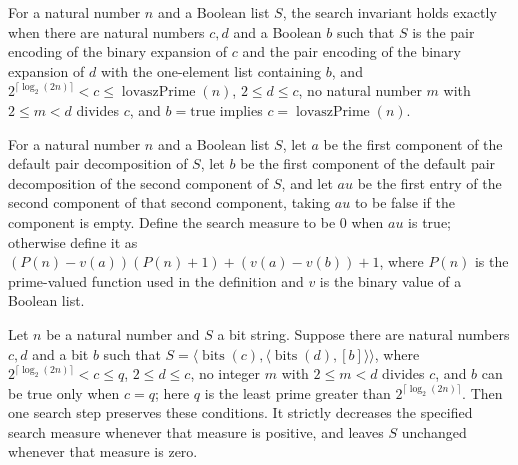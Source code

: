 \begin{definition}
\label{Complexity.BinArith.SearchInv}
\leanok
{}
For a natural number $n$ and a Boolean list $S$, the search invariant holds exactly when
there are natural numbers $c,d$ and a Boolean $b$ such that $S$ is the pair encoding of
the binary expansion of $c$ and the pair encoding of the binary expansion of $d$ with
the one-element list containing $b$, and
$2^{\lceil\log_2(2n)\rceil}<c\leq \operatorname{lovaszPrime}(n)$, $2\leq d\leq c$, no
natural number $m$ with $2\leq m<d$ divides $c$, and $b=\mathrm{true}$ implies
$c=\operatorname{lovaszPrime}(n)$.
\end{definition}

\begin{definition}
\label{Complexity.BinArith.searchMeasure}
\leanok
{}
For a natural number $n$ and a Boolean list $S$, let $a$ be the first component of the
default pair decomposition of $S$, let $b$ be the first component of the default pair
decomposition of the second component of $S$, and let $	au$ be the first entry of the
second component of that second component, taking $	au$ to be false if the component is
empty. Define the search measure to be $0$ when $	au$ is true; otherwise define it as
$(P(n)-v(a))(P(n)+1)+(v(a)-v(b))+1$, where $P(n)$ is the prime-valued function used in
the definition and $v$ is the binary value of a Boolean list.
\end{definition}

\begin{theorem}
\label{Complexity.BinArith.searchInv_step}
\leanok
{}
Let $n$ be a natural number and $S$ a bit string. Suppose there are natural numbers
$c,d$ and a bit $b$ such that
$S=\langle\operatorname{bits}(c),\langle\operatorname{bits}(d),[b]\rangle\rangle$, where
$2^{\lceil\log_2(2n)\rceil}<c\leq q$, $2\leq d\leq c$, no integer $m$ with $2\leq m<d$
divides $c$, and $b$ can be true only when $c=q$; here $q$ is the least prime greater
than $2^{\lceil\log_2(2n)\rceil}$. Then one search step preserves these conditions. It
strictly decreases the specified search measure whenever that measure is positive, and
leaves $S$ unchanged whenever that measure is zero.
\end{theorem}

